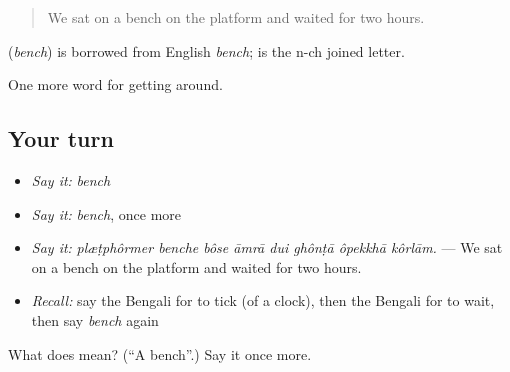 \begin{quote}
We sat on a bench on the platform and waited for two hours.
\end{quote}

\begin{cousinweb}
\textbf{} (\emph{bench}) is borrowed from English \emph{bench};  is the n-ch joined letter.
\end{cousinweb}

\begin{grammarlens}[title={What you've built}]
One more word for getting around.
\end{grammarlens}

\subsection*{Your turn}
\begin{itemize}
\raggedright
  \item \emph{Say it:} \emph{bench}
  \item \emph{Say it:} \emph{bench}, once more
  \item \emph{Say it:} \emph{plæṭphôrmer benche bôse āmrā dui ghônṭā ôpekkhā kôrlām.} — We sat on a bench on the platform and waited for two hours.
  \item \emph{Recall:} say the Bengali for to tick (of a clock), then the Bengali for to wait, then say \emph{bench} again
\end{itemize}

\begin{tcolorbox}[breakable,colback=teal!4,colframe=teal!35!black,title={Before you move on}]
What does  mean? (\textquotedblleft{}A bench\textquotedblright{}.) Say it once more.
\end{tcolorbox}
